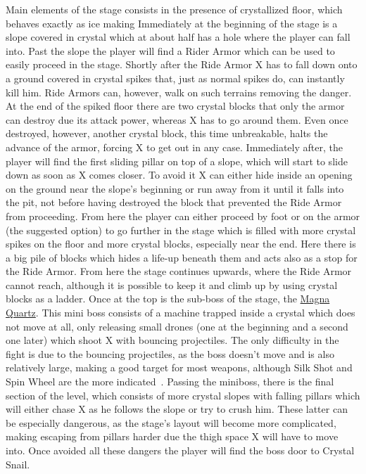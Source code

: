 Main elements of the stage consists in the presence of crystallized floor, which behaves exactly as ice making 
Immediately at the beginning of the stage is a slope covered in crystal which at about half has a hole where the player can fall into. Past the slope the player will find a Rider Armor which can be used to easily proceed in the stage. Shortly after the Ride Armor X has to fall down onto a ground covered in crystal spikes that, just as normal spikes do, can instantly kill him. Ride Armors can, however, walk on such terrains removing the danger. At the end of the spiked floor there are two crystal blocks that only the armor can destroy due its attack power, whereas X has to go around them. Even once destroyed, however, another crystal block, this time unbreakable, halts the advance of the armor, forcing X to get out in any case. Immediately after, the player will find the first sliding pillar on top of a slope, which will start to slide down as soon as X comes closer. To avoid it X can either hide inside an opening on the ground near the slope's beginning or run away from it until it falls into the pit, not before having destroyed the block that prevented the Ride Armor from proceeding. From here the player can either proceed by foot or on the armor (the suggested option) to go further in the stage which is filled with more crystal spikes on the floor and more crystal blocks, especially near the end. Here there is a big pile of blocks which hides a life-up beneath them and acts also as a stop for the Ride Armor. From here the stage continues upwards, where the Ride Armor cannot reach, although it is possible to keep it  and climb up by using crystal blocks as a ladder. Once at the top is the sub-boss of the stage, the \hyperlink{miniboss:Magna_Quartz}{Magna Quartz}. This mini boss consists of a machine trapped inside a crystal which does not move at all, only releasing small drones (one at the beginning and a second one later) which shoot X with bouncing projectiles. The only difficulty in the fight is due to the bouncing projectiles, as the boss doesn't move and is also relatively large, making a good target for most weapons, although Silk Shot and Spin Wheel are the more indicated~\cite{wiki:Magna_quartz}. Passing the miniboss, there is the final section of the level, which consists of more crystal slopes with falling pillars which will either chase X as he follows the slope or try to crush him. These latter can be especially dangerous, as the stage's layout will become more complicated, making escaping from pillars harder due the thigh space X will have to move into. Once avoided all these dangers the player will find the boss door to Crystal Snail.

